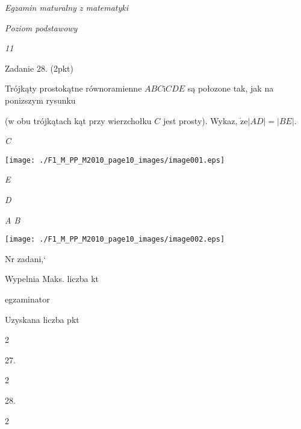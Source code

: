 \documentclass[a4paper,12pt]{article}
\begin{document}
{\it Egzamin maturalny z matematyki}

{\it Poziom podstawowy}

{\it 11}

Zadanie 28. (2pkt)

Trójkąty prostokątne równoramienne $ABC\mathrm{i}CDE$ są połozone tak, jak na ponizszym rysunku

(w obu trójkątach kąt przy wierzchołku $C$ jest prosty). Wykaz, $\dot{\mathrm{z}}\mathrm{e}|AD|=|BE|.$

{\it C}
\begin{center}
\texttt{[image: ./F1\_M\_PP\_M2010\_page10\_images/image001.eps]}
\end{center}
{\it E}

{\it D}

{\it A  B}
\begin{center}
\texttt{[image: ./F1\_M\_PP\_M2010\_page10\_images/image002.eps]}
\end{center}
Nr zadani,`

Wypelnia Maks. liczba kt

egzaminator

Uzyskana liczba pkt

2

27.

2

28.

2
\end{document}
